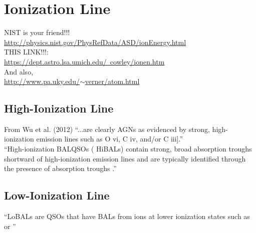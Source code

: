 \documentclass[11pt]{article}
\begin{document}
\section{Ionization Line}
NIST is your friend!!!\\
\href{http://physics.nist.gov/PhysRefData/ASD/ionEnergy.html}{http://physics.nist.gov/PhysRefData/ASD/ionEnergy.html}\\


\noindent
THIS LINK!!!:\\
\href{https://dept.astro.lsa.umich.edu/~cowley/ionen.htm}{https://dept.astro.lsa.umich.edu/~cowley/ionen.htm}\\

\noindent
And also, \\
\href{http://www.pa.uky.edu/$\sim$verner/atom.html}{http://www.pa.uky.edu/$\sim$verner/atom.html}\\


     \subsection{High-Ionization Line}
     From Wu et al. (2012)
    ``...are clearly AGNs as evidenced by strong, high-ionization emission lines such as O vi, C iv, and/or C iii].''\\

    ``High-ionization BALQSOs ( HiBALs) contain strong, broad absorption troughs shortward of high-ionization emission lines and are typically identified through the presence of \civ absorption troughs \citep{Trump06}.''
    

     \subsection{Low-Ionization Line}
     ``LoBALs are QSOs that have BALs from ions at lower ionization states such as \aliii or \mgii''  \citep{Gibson09}
\end{document}
